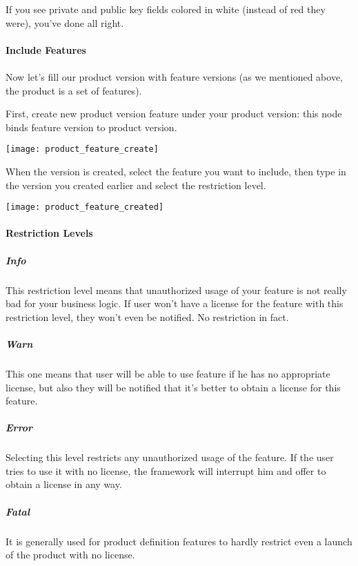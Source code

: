 \documentclass[12pt]{report}
\begin{document}
If you see private and public key fields colored in white (instead of red they were), you've done all right.

\paragraph*{Include Features}
\paragraph*{}

Now let's fill our product version with feature versions (as we mentioned above, the product is a set of features).

First, create new product version feature under your product version: this node binds feature version to product version.

\begin{center}
    \texttt{[image: product\_feature\_create]}
\end{center}

When the version is created, select the feature you want to include, then type in the version you created earlier and select the restriction level.

\begin{center}
    \texttt{[image: product\_feature\_created]}
\end{center}

\paragraph*{Restriction Levels}

\subparagraph*{Info}
This restriction level means that unauthorized usage of your feature is not really bad for your business logic. If user won't have a license for the feature with this restriction
level, they won't even be notified. No restriction in fact.

\subparagraph*{Warn}
This one means that user will be able to use feature if he has no appropriate license, but also they will be notified that it's better to obtain a license for this feature.

\subparagraph*{Error}
Selecting this level restricts any unauthorized usage of the feature. If the user tries to use it with no license, the framework will interrupt him and offer to obtain a license in any way.

\subparagraph*{Fatal}
It is generally used for product definition features to hardly restrict even a launch of the product with no license.
\end{document}
